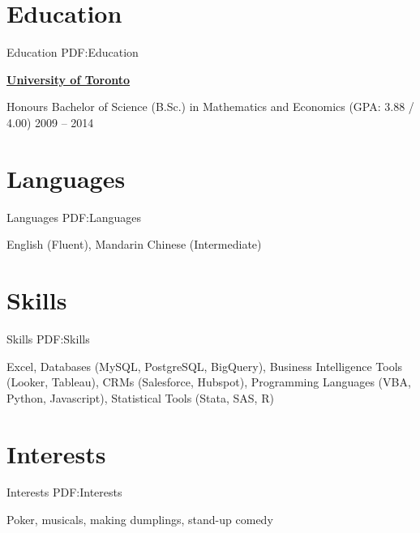 \documentclass[letterpaper,10pt,oneside]{article}
\begin{document}
\begin{body}
\section
{Education}
{Education}
{PDF:Education}

\href{https://www.utoronto.ca/}
{\textbf{University of Toronto}}

\GapNoBreak
\BulletItem
Honours Bachelor of Science (B.Sc.) in Mathematics and Economics (GPA: 3.88 / 4.00)
\hfill
2009 -- 2014


\section
{Languages}
{Languages}
{PDF:Languages}

English (Fluent), Mandarin Chinese (Intermediate)


\section
{Skills}
{Skills}
{PDF:Skills}

Excel, Databases (MySQL, PostgreSQL, BigQuery), Business Intelligence Tools (Looker, Tableau), CRMs (Salesforce, Hubspot), Programming Languages (VBA, Python, Javascript), Statistical Tools (Stata, SAS, R)


\section
{Interests}
{Interests}
{PDF:Interests}

Poker, musicals, making dumplings, stand-up comedy

\end{body}
\end{document}
